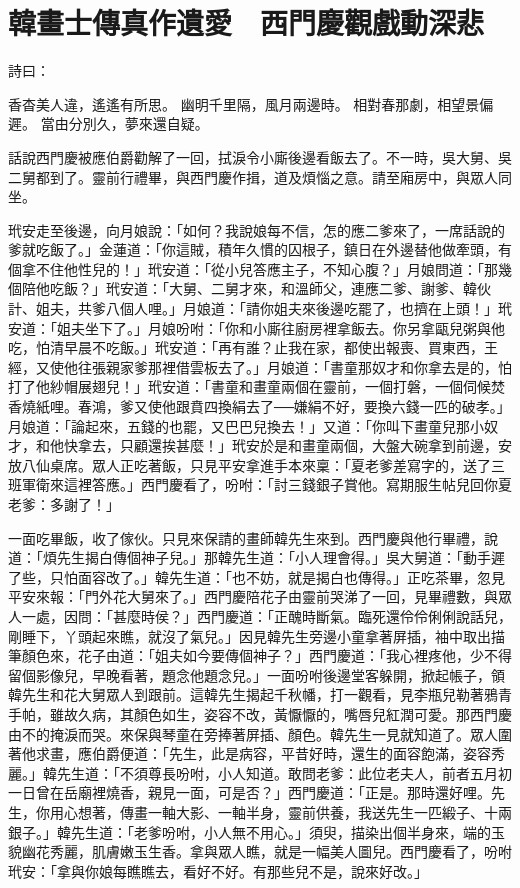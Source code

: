 %

\chapter{韓畫士傳真作遺愛　西門慶觀戲動深悲}

詩曰：

香杳美人違，遙遙有所思。
幽明千里隔，風月兩邊時。
相對春那劇，相望景偏遲。
當由分別久，夢來還自疑。

話說西門慶被應伯爵勸解了一回，拭淚令小廝後邊看飯去了。不一時，吳大舅、吳二舅都到了。靈前行禮畢，與西門慶作揖，道及煩惱之意。請至廂房中，與眾人同坐。

玳安走至後邊，向月娘說：「如何？我說娘每不信，怎的應二爹來了，一席話說的爹就吃飯了。」金蓮道：「你這賊，積年久慣的囚根子，鎮日在外邊替他做牽頭，有個拿不住他性兒的！」玳安道：「從小兒答應主子，不知心腹？」月娘問道：「那幾個陪他吃飯？」玳安道：「大舅、二舅才來，和溫師父，連應二爹、謝爹、韓伙計、姐夫，共爹八個人哩。」月娘道：「請你姐夫來後邊吃罷了，也擠在上頭！」玳安道：「姐夫坐下了。」月娘吩咐：「你和小廝往廚房裡拿飯去。你另拿甌兒粥與他吃，怕清早晨不吃飯。」玳安道：「再有誰？止我在家，都使出報喪、買東西，王經，又使他往張親家爹那裡借雲板去了。」月娘道：「書童那奴才和你拿去是的，怕打了他紗帽展翅兒！」玳安道：「書童和畫童兩個在靈前，一個打磐，一個伺候焚香燒紙哩。春鴻，爹又使他跟賁四換絹去了──嫌絹不好，要換六錢一匹的破孝。」月娘道：「論起來，五錢的也罷，又巴巴兒換去！」又道：「你叫下畫童兒那小奴才，和他快拿去，只顧還挨甚麼！」玳安於是和畫童兩個，大盤大碗拿到前邊，安放八仙桌席。眾人正吃著飯，只見平安拿進手本來稟：「夏老爹差寫字的，送了三班軍衛來這裡答應。」西門慶看了，吩咐：「討三錢銀子賞他。寫期服生帖兒回你夏老爹：多謝了！」

一面吃畢飯，收了傢伙。只見來保請的畫師韓先生來到。西門慶與他行畢禮，說道：「煩先生揭白傳個神子兒。」那韓先生道：「小人理會得。」吳大舅道：「動手遲了些，只怕面容改了。」韓先生道：「也不妨，就是揭白也傳得。」正吃茶畢，忽見平安來報：「門外花大舅來了。」西門慶陪花子由靈前哭涕了一回，見畢禮數，與眾人一處，因問：「甚麼時侯？」西門慶道：「正醜時斷氣。臨死還伶伶俐俐說話兒，剛睡下，丫頭起來瞧，就沒了氣兒。」因見韓先生旁邊小童拿著屏插，袖中取出描筆顏色來，花子由道：「姐夫如今要傳個神子？」西門慶道：「我心裡疼他，少不得留個影像兒，早晚看著，題念他題念兒。」一面吩咐後邊堂客躲開，掀起帳子，領韓先生和花大舅眾人到跟前。這韓先生揭起千秋幡，打一觀看，見李瓶兒勒著鴉青手帕，雖故久病，其顏色如生，姿容不改，黃懨懨的，嘴唇兒紅潤可愛。那西門慶由不的掩淚而哭。來保與琴童在旁捧著屏插、顏色。韓先生一見就知道了。眾人圍著他求畫，應伯爵便道：「先生，此是病容，平昔好時，還生的面容飽滿，姿容秀麗。」韓先生道：「不須尊長吩咐，小人知道。敢問老爹：此位老夫人，前者五月初一日曾在岳廟裡燒香，親見一面，可是否？」西門慶道：「正是。那時還好哩。先生，你用心想著，傳畫一軸大影、一軸半身，靈前供養，我送先生一匹緞子、十兩銀子。」韓先生道：「老爹吩咐，小人無不用心。」須臾，描染出個半身來，端的玉貌幽花秀麗，肌膚嫩玉生香。拿與眾人瞧，就是一幅美人圖兒。西門慶看了，吩咐玳安：「拿與你娘每瞧瞧去，看好不好。有那些兒不是，說來好改。」

